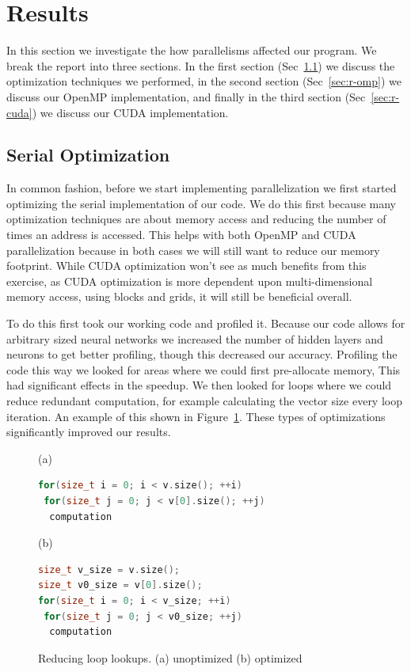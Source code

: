\section{Results}\label{sec:results}
In this section we investigate the how parallelisms affected our program. We
break the report into three sections. In the first section (Sec~\ref{sec:r-opt})
we discuss the optimization techniques we performed, in the second
section (Sec~\ref{sec:r-omp}) we discuss our OpenMP implementation, and finally
in the third section (Sec~\ref{sec:r-cuda}) we discuss our CUDA implementation. 

\subsection{Serial Optimization}\label{sec:r-opt}
In common fashion, before we start implementing parallelization we first started
optimizing the serial implementation of our code. We do this first because many
optimization techniques are about memory access and reducing the number of times
an address is accessed. This helps with both OpenMP and CUDA parallelization
because in both cases we will still want to reduce our memory footprint. While
CUDA optimization won't see as much benefits from this exercise, as CUDA
optimization is more dependent upon multi-dimensional memory access, using
blocks and grids, it will still be beneficial overall. 

To do this first took our working code and profiled it. Because our code allows
for arbitrary sized neural networks we increased the number of hidden layers and
neurons to get better profiling, though this decreased our accuracy. 
Profiling the code this way we looked for areas where we could
first pre-allocate memory, This had significant effects in the speedup. We then
looked for loops where we could reduce redundant computation, for example
calculating the vector size every loop iteration. An example of this shown in 
Figure~\ref{fig:opt}. These types of optimizations significantly improved our
results. 

\begin{figure}[ht]
(a)
\begin{lstlisting}[language=C++,
                   directivestyle={\color{black}},
                   emph={size_t},
                   emphstyle={\color{blue}}]
for(size_t i = 0; i < v.size(); ++i)
 for(size_t j = 0; j < v[0].size(); ++j)
  computation
\end{lstlisting}
(b)
\begin{lstlisting}[language=C++,
                   directivestyle={\color{black}},
                   emph={size_t},
                   emphstyle={\color{blue}}]
size_t v_size = v.size();
size_t v0_size = v[0].size();
for(size_t i = 0; i < v_size; ++i)
 for(size_t j = 0; j < v0_size; ++j)
  computation
\end{lstlisting}
\caption{Reducing loop lookups. (a) unoptimized (b) optimized}
\label{fig:opt}
\end{figure}

